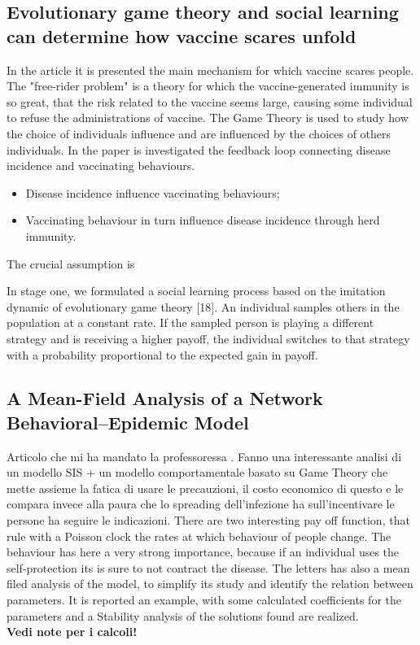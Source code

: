 \documentclass[a4paper,11pt]{scrartcl}
\begin{document}
	\subsection{Evolutionary game theory and social learning can determine how vaccine scares unfold}
	In the article \cite{Bauch2012} it is presented the main mechanism for which vaccine scares people. The "free-rider problem" is a theory for which the vaccine-generated immunity is so great, that the risk related to the vaccine seems large, causing some individual to refuse the administrations of vaccine.
	The Game Theory is used to study how the choice of individuals influence and are influenced by the choices of others individuals. 
	In the paper is investigated the feedback loop connecting disease incidence and vaccinating behaviours. 
	\begin{itemize}
	\item  Disease incidence influence vaccinating behaviours;
	\item Vaccinating behaviour in turn influence disease incidence through herd immunity. 
	\end{itemize}
	The crucial assumption is
	
	In stage one, we formulated a social learning process based on the imitation dynamic of evolutionary game theory [18]. An individual samples others in the population at a constant rate. If the sampled person is playing a different strategy and is receiving a higher payoff, the individual switches to that strategy with a probability proportional to the expected gain in payoff.
	
	
	\subsection{A Mean-Field Analysis of a Network Behavioral–Epidemic Model}
	
	Articolo che mi ha mandato la professoressa \cite{Frieswijk2022}. Fanno una interessante analisi di un modello SIS + un modello comportamentale basato su Game Theory che mette assieme la fatica di usare le precauzioni, il costo economico di questo e le compara invece alla paura che lo spreading dell'infezione ha sull'incentivare le persone ha seguire le indicazioni.
	There are two interesting pay off function, that rule with a Poisson clock the rates at which behaviour of people change. 
	The behaviour has here a very strong importance, because if an individual uses the self-protection its is sure to not contract the disease. 
	The letters has also a mean filed analysis of the model, to simplify its study and identify the relation between parameters. It is reported an example, with some calculated coefficients for the parameters and a Stability analysis of the solutions found are realized. 
	\\
	\textbf{Vedi note per i calcoli!} 
	
\end{document}
